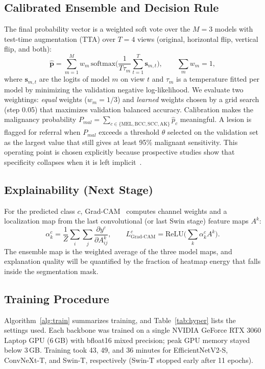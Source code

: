 \subsection{Calibrated Ensemble and Decision Rule}\label{sec:m_ens}
The final probability vector is a weighted soft vote over the $M=3$
models with test-time augmentation (TTA) over $T=4$ views (original,
horizontal flip, vertical flip, and both):
\begin{equation}
\hat{\mathbf{p}} = \sum_{m=1}^{M} w_m\,
\mathrm{softmax}\!\Big(\frac{1}{T\tau_m}\sum_{t=1}^{T}\mathbf{s}_{m,t}\Big),\qquad \sum_m w_m = 1,
\label{eq:ens}
\end{equation}
where $\mathbf{s}_{m,t}$ are the logits of model $m$ on view $t$ and
$\tau_m$ is a temperature fitted per model by minimizing the validation
negative log-likelihood. We evaluate two weightings: \emph{equal}
weights ($w_m=1/3$) and \emph{learned} weights chosen by a grid search
(step 0.05) that maximizes validation balanced accuracy. Calibration
makes the malignancy probability
$P_{mal}=\sum_{c\in\{\mathrm{MEL,BCC,SCC,AK}\}}\hat{p}_c$ meaningful.
A lesion is flagged for referral when $P_{mal}$ exceeds a threshold
$\theta$ selected on the validation set as the largest value that still
gives at least 95\% malignant sensitivity. This operating point is chosen
explicitly because prospective studies show that specificity collapses
when it is left implicit~\cite{marchetti2023,marsden2023}.

\subsection{Explainability (Next Stage)}\label{sec:m_xai}
For the predicted class $c$, Grad-CAM~\cite{selvaraju2017gradcam}
computes channel weights and a localization map from the last
convolutional (or last Swin stage) feature maps $A^k$:
\begin{equation}
\alpha_k^c=\frac{1}{Z}\sum_{i}\sum_{j}\frac{\partial y^c}{\partial A^k_{ij}},\qquad
L^c_{\text{Grad-CAM}}=\mathrm{ReLU}\Big(\sum_k\alpha_k^c A^k\Big).
\end{equation}
The ensemble map is the weighted average of the three model maps, and
explanation quality will be quantified by the fraction of heatmap
energy that falls inside the segmentation mask.

\subsection{Training Procedure}
Algorithm~\ref{alg:train} summarizes training, and
Table~\ref{tab:hyper} lists the settings used. Each backbone was trained
on a single NVIDIA GeForce RTX 3060 Laptop GPU (6\,GB) with bfloat16
mixed precision; peak GPU memory stayed below 3\,GB. Training took 43,
49, and 36 minutes for EfficientNetV2-S, ConvNeXt-T, and Swin-T,
respectively (Swin-T stopped early after 11 epochs).

